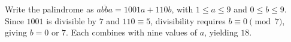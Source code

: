 Write the palindrome as $\overline{abba}=1001a+110b$, with $1\le a\le9$ and $0\le b\le9$. Since $1001$ is divisible by $7$ and $110\equiv5$, divisibility requires $b\equiv0\pmod7$, giving $b=0$ or $7$. Each combines with nine values of $a$, yielding $\boxed{18}$.
